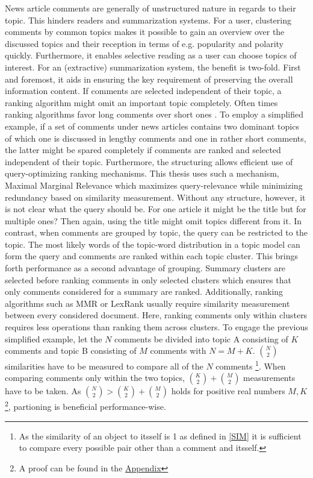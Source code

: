 News article comments are generally of unstructured nature in regards to their topic. This hinders readers \cite{DBLP:conf/acl/BarkerG16} and summarization systems. For a user, clustering comments by common topics makes it possible to gain an overview over the discussed topics and their reception in terms of e.g. popularity and polarity quickly. Furthermore, it enables selective reading as a user can choose topics of interest. For an (extractive) summarization system, the benefit is two-fold. First and foremost, it aids in ensuring the key requirement of preserving the overall information content. If comments are selected independent of their topic, a ranking algorithm might omit an important topic completely. Often times ranking algorithms favor long comments over short ones \cite{llewellyn_grover_oberlander}. To employ a simplified example, if a set of comments under news articles contains two dominant topics of which one is discussed in lengthy comments and one in rather short comments, the latter might be spared completely if comments are ranked and selected independent of their topic. Furthermore, the structuring allows efficient use of query-optimizing ranking mechanisms. This thesis uses such a mechanism, Maximal Marginal Relevance \cite{Carbonell:1998:UMD:290941.291025} which maximizes query-relevance while minimizing redundancy based on similarity measurement. Without any structure, however, it is not clear what the query should be. For one article it might be the title but for multiple ones? Then again, using the title might omit topics different from it. In contrast, when comments are grouped by topic, the query can be restricted to the topic. The most likely words of the topic-word distribution in a topic model can form the query and comments are ranked within each topic cluster. This brings forth performance as a second advantage of grouping. Summary clusters are selected before ranking comments in only selected clusters which ensures that only comments considered for a summary are ranked. Additionally, ranking algorithms such as MMR \cite{Carbonell:1998:UMD:290941.291025} or LexRank \cite{DBLP:journals/corr/abs-1109-2128} usually require similarity measurement between every considered document. Here, ranking comments only within clusters requires less operations than ranking them across clusters. To engage the previous simplified example, let the $N$ comments be divided into topic A consisting of $K$ comments and topic B consisting of $M$ comments with $N=M+K$. $\binom{N}{2}$ similarities have to be measured to compare all of the $N$ comments \footnote{As the similarity of an object to itsself is 1 as defined in \autoref{SIM} it is sufficient to compare every possible pair other than a comment and itsself.}. When comparing comments only within the two topics, $\binom{K}{2} + \binom{M}{2}$ measurements have to be taken. As $\binom{N}{2} > \binom{K}{2} + \binom{M}{2}$ holds for positive real numbers $M,K$\footnote{A proof can be found in the \hyperref[partitionproof]{Appendix}}, partioning is beneficial performance-wise.
